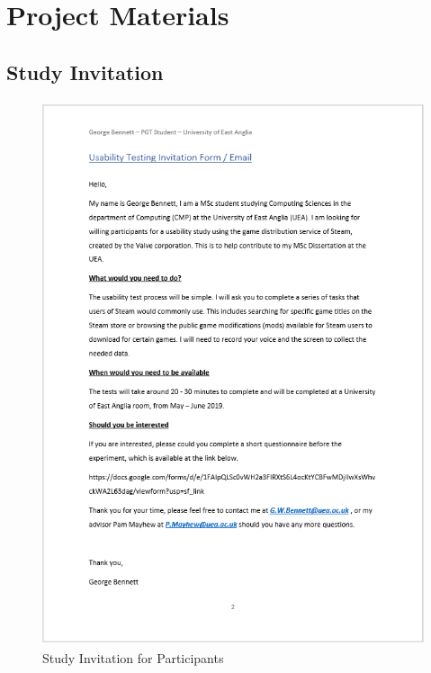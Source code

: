 \chapter{Project Materials}
\section{Study Invitation}
\begin{figure}[H]
    \includegraphics[width=14cm,height=16cm]{Screenshots/StudyMaterialScreenshots/Invitation.png}
    \caption{Study Invitation for Participants}
\end{figure}

